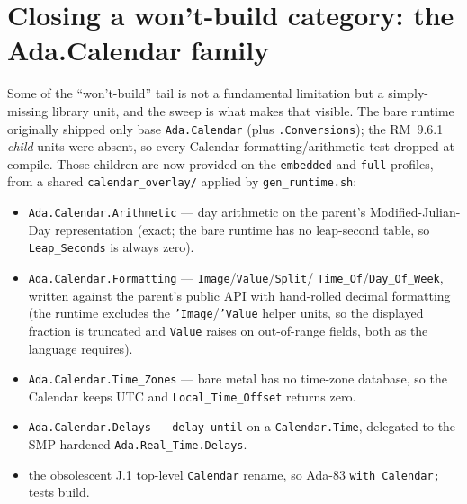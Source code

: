 \section{Closing a won't-build category: the Ada.Calendar family}

Some of the ``won't-build'' tail is not a fundamental limitation but a simply-missing library
unit, and the sweep is what makes that visible. The bare runtime originally shipped only base
\texttt{Ada.Calendar} (plus \texttt{.Conversions}); the RM~9.6.1 \emph{child} units were
absent, so every Calendar formatting/arithmetic test dropped at compile. Those children are now
provided on the \texttt{embedded} and \texttt{full} profiles, from a shared
\texttt{calendar\_overlay/} applied by \texttt{gen\_runtime.sh}:

\begin{itemize}
  \item \texttt{Ada.Calendar.Arithmetic} --- day arithmetic on the parent's
        Modified-Julian-Day representation (exact; the bare runtime has no leap-second table,
        so \texttt{Leap\_Seconds} is always zero).
  \item \texttt{Ada.Calendar.Formatting} --- \texttt{Image}/\texttt{Value}/\texttt{Split}/
        \texttt{Time\_Of}/\texttt{Day\_Of\_Week}, written against the parent's public API with
        hand-rolled decimal formatting (the runtime excludes the \texttt{'Image}/\texttt{'Value}
        helper units, so the displayed fraction is truncated and \texttt{Value} raises on
        out-of-range fields, both as the language requires).
  \item \texttt{Ada.Calendar.Time\_Zones} --- bare metal has no time-zone database, so the
        Calendar keeps UTC and \texttt{Local\_Time\_Offset} returns zero.
  \item \texttt{Ada.Calendar.Delays} --- \texttt{delay until} on a \texttt{Calendar.Time},
        delegated to the SMP-hardened \texttt{Ada.Real\_Time.Delays}.
  \item the obsolescent J.1 top-level \texttt{Calendar} rename, so Ada-83 \texttt{with Calendar;}
        tests build.
\end{itemize}

